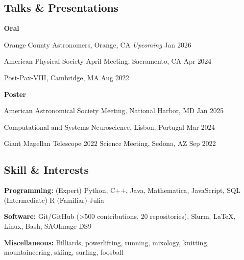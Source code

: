 \documentclass[12pt,letterpaper]{article}
\begin{document}
\subsection{Talks \& Presentations}
\begin{list}{}{\cvlist}
  \item \textbf{Oral}
  \begin{bulletdescription}
    \item Orange County Astronomers, Orange, CA \hfill \textit{Upcoming} \textcolor{niceblue}{Jan 2026}
    \item American Physical Society April Meeting, Sacramento, CA \hfill \textcolor{niceblue}{Apr 2024}
    \item Post-Pax-VIII, Cambridge, MA \hfill \textcolor{niceblue}{Aug 2022}
  \end{bulletdescription}

  \item \textbf{Poster}
  \begin{bulletdescription}
    \item American Astronomical Society Meeting, National Harbor, MD \hfill \textcolor{niceblue}{Jan 2025}
    \item Computational and Systems Neuroscience, Lisbon, Portugal \hfill \textcolor{niceblue}{Mar 2024}
    \item Giant Magellan Telescope 2022 Science Meeting, Sedona, AZ \hfill \textcolor{niceblue}{Sep 2022}
  \end{bulletdescription}
\end{list}

\subsection{Skill \& Interests}
\begin{list}{}{\cvlist}
  \item \textbf{Programming:} (Expert) Python, C++, Java, Mathematica, JavaScript, SQL (Intermediate) R (Familiar) Julia
  \item \textbf{Software:} Git/GitHub (>500 contributions, 20 repositories), Slurm, \LaTeX, Linux, Bash, SAOImage DS9
  \item \textbf{Miscellaneous:} Billiards, powerlifting, running, mixology, knitting, mountaineering, skiing, surfing, foosball
\end{list}
\end{document}
